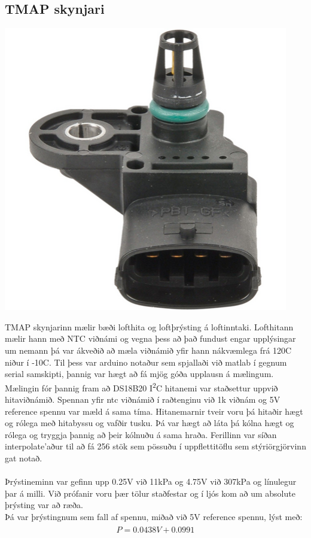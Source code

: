 \documentclass[paper=a4, fontsize=11pt]{scrartcl}
\numberwithin{equation}{section}		%
\numberwithin{figure}{section}			%
\numberwithin{table}{section}				%
\begin{document}
\subsection{TMAP skynjari}
\begin{center}
\includegraphics[scale = 0.5]{tmap.png}\\
\end{center}
TMAP skynjarinn  mælir bæði lofthita og loftþrýsting á loftinntaki. Lofthitann mælir hann með NTC viðnámi og vegna þess að það fundust engar upplýsingar um nemann þá var ákveðið að mæla viðnámið yfir hann nákvæmlega frá 120\textdegree C niður í -10\textdegree C. Til þess var arduino notaður sem spjallaði við matlab í gegnum serial samskipti, þannig var hægt að fá mjög góða upplausn á mælingum.\\
Mælingin fór þannig fram að DS18B20 I\textsuperscript{2}C hitanemi var staðsettur uppvið hitaviðnámið. Spennan yfir ntc viðnámið í raðtenginu við 1k viðnám og 5V reference spennu var mæld á sama tíma. Hitanemarnir tveir voru þá hitaðir hægt og rólega með hitabyssu og vafðir tusku. Þá var hægt að láta þá kólna hægt og rólega og tryggja þannig að þeir kólnuðu á sama hraða. Ferillinn var síðan interpolate'aður til að fá 256 stök sem pössuðu í uppflettitöflu sem stýriörgjörvinn gat notað. \\
\\
Þrýstineminn var gefinn upp 0.25V við 11kPa og 4.75V við 307kPa og línulegur þar á milli. Við prófanir voru þær tölur staðfestar og í ljós kom að um absolute þrýsting var að ræða. \\
Þá var þrýstingnum sem fall af spennu, miðað við 5V reference spennu, lýst með: 
\begin{align} 
	\begin{split}
	P=0.0438V + 0.0991 
	\end{split}					
\end{align}
\end{document}
